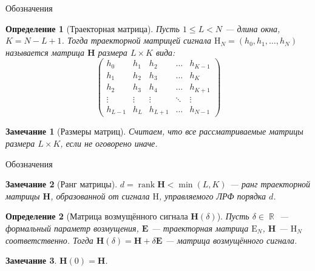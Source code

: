 \documentclass[notheorems, handout]{beamer}
\newtheorem{remark}{Замечание}
\newtheorem{definition}{Определение}
\DeclareMathOperator{\R}{\mathbb{R}}
\DeclareMathOperator{\rank}{\mathrm{rank}}
\begin{document}
	\begin{frame}{Обозначения}
		\begin{definition}[Траекторная матрица]
			Пусть $1\leqslant L < N$ --- длина окна, $K=N-L+1$. Тогда траекторной матрицей сигнала $\mathrm{H}_N = (h_0, h_1, \dots, h_N)$ называется матрица $\mathbf{H}$ размера $L\times K$ вида:
			\begin{equation*}
				\begin{pmatrix}
					h_0&h_1&h_2&\dots&h_{K-1}\\
					h_1&h_2&h_3&\dots&h_K\\
					h_2&h_3&h_4&\dots&h_{K+1}\\
					\vdots&\vdots&\vdots&\ddots&\vdots\\
					h_{L-1}&h_L&h_{L+1}&\dots&h_{N-1}
				\end{pmatrix}
			\end{equation*}
		\end{definition}
		\begin{remark}[Размеры матриц]
			Считаем, что все рассматриваемые матрицы размера $L\times K$, если не оговорено иначе.	
		\end{remark}
	\end{frame}
	\begin{frame}{Обозначения}
		\begin{remark}[Ранг матрицы]
			$d = \rank\mathbf{H} < \min(L, K)$ --- ранг траекторной матрицы $\mathbf{H}$, образованной от сигнала $\mathrm{H}$, управляемого ЛРФ порядка $d$.
		\end{remark}
		\begin{definition}[Матрица возмущённого сигнала $\mathbf{H}(\delta)$]
			Пусть $\delta\in\R$ --- формальный параметр возмущения, $\mathbf{E}$ --- траекторная матрица $\mathrm{E}_N$, $\mathbf{H}$ --- $\mathrm{H}_N$ соответственно.  Тогда $\mathbf{H}(\delta) = \mathbf{H} + \delta\mathbf{E}$ --- матрица возмущённого сигнала.
		\end{definition}
		\begin{remark}
			$\mathbf{H}(0) = \mathbf{H}$.
		\end{remark}
	\end{frame}
\end{document}
